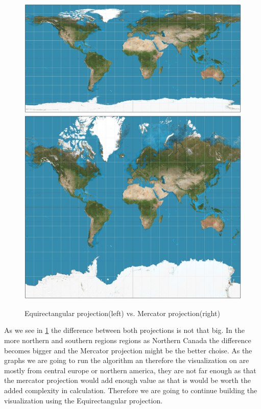 \documentclass
[
	paper = a4,
    pagesize,
	12 pt,
	oneside,                       %
    open = right,
	DIV = calc,
	BCOR = 0 mm,                   %
	bibtotoc
]
{scrbook}
\begin{document}

\begin{figure}[H]
	\includegraphics[width=.5\textwidth]{Images/Equirectangular_projection_SW.jpg}
	\includegraphics[width=.5\textwidth]{Images/Mercator_projection_SW.jpg}
\caption[]{Equirectangular projection(left) vs. Mercator projection(right)}
\label{fig:projections}
\end{figure}

As we see in \cref{fig:projections} the difference between both projections is not that big.
In the more northern and southern regions regions as Northern Canada the difference becomes bigger and the Mercator projection might be the better choise.
As the graphs we are going to run the algorithm an therefore the visualization on are mostly from central europe or northern america, they are not far enough as that the mercator projection would add enough value as that is would be worth the added complexity in calculation.
Therefore we are going to continue building the visualization using the  Equirectangular projection.

%
\end{document}

